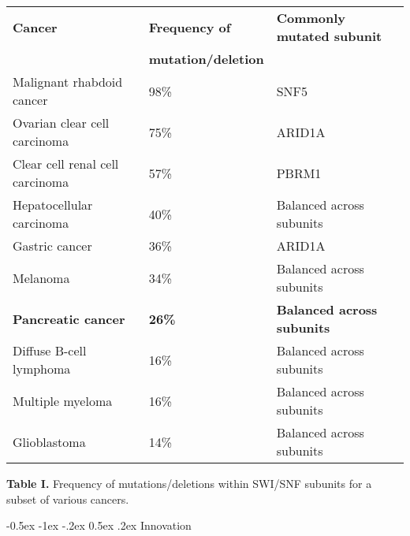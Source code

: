 \documentclass[11pt]{article}
\makeatletter
\renewcommand\section{\@startsection {section}{1}{\z@}%
{-0.5ex \@plus -1ex \@minus -.2ex}%
{0.5ex \@plus.2ex}%
{\color{dukeblue}\sffamily\Large\bfseries}}
\makeatother
\begin{document}
\begin{center}
\begin{tabular}{l p{3cm} l}
\textbf{Cancer}  & \textbf{Frequency of} & \textbf{Commonly mutated subunit} \\
& \textbf{mutation/deletion} & \\
\hline  \noalign{\smallskip}
Malignant rhabdoid cancer~\citep{Biegel1999} & 98\% & SNF5 \\
Ovarian clear cell carcinoma~\citep{Shain2013,Jones2010} & 75\% & ARID1A \\
Clear cell renal cell carcinoma~\citep{Shain2013,Varela2011} & 57\% & PBRM1\\
Hepatocellular carcinoma~\citep{Shain2013,Li2011} & 40\% & Balanced across subunits \\
Gastric cancer~\citep{Shain2013,Wang2011} & 36\% & ARID1A \\
Melanoma~\citep{Shain2013,Wei2011,Nikolaev2011,Stark2011} & 34\% & Balanced across subunits \\
\textcolor{dukeblue}{\textbf{Pancreatic cancer}~\citep{Shain2013,Jones2008,Wang2011}} & \textcolor{dukeblue}{\textbf{26\%}} & \textcolor{dukeblue}{\textbf{Balanced across subunits}} \\
Diffuse B-cell lymphoma~\citep{Shain2013,Lohr2012,Pasqualucci2011,Morin2011} & 16\% & Balanced across subunits \\
Multiple myeloma~\citep{Shain2013,Chapman2011} & 16\% & Balanced across subunits \\
Glioblastoma~\citep{Shain2013,Parsons2008} & 14\% & Balanced across subunits \\
\hline
\end{tabular}

{\sffamily \color{dukeblue} \footnotesize \textbf{Table I.} Frequency of mutations/deletions within SWI/SNF subunits for a subset of various cancers.}

\end{center}

\section{Innovation}
 
\end{document}
